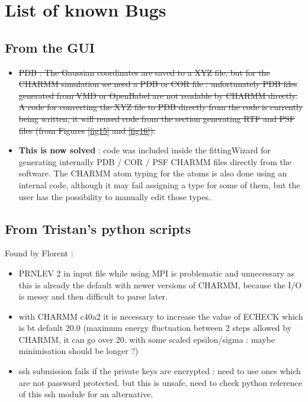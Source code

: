 \documentclass[12pt,a4paper]{article}
\begin{document}

\section{List of known Bugs}

\subsection{From the GUI}

\begin{itemize}
\item \sout{ 
PDB : The Gaussian coordinates are saved to a XYZ file, but for the CHARMM simulation 
we need 
a PDB or COR file : unfortunately PDB files generated from VMD or OpenBabel are not readable by 
CHARMM directly. A code for converting the XYZ file to PDB directly from the code is currently 
being written, it will reused code from the section generating RTF and PSF files (from Figures 
\ref{fig15} and \ref{fig16}). 
}

\item \textbf{This is now solved} : code was included inside the fittingWizard for generating 
internally PDB 
/ COR / PSF CHARMM files directly from the software. The CHARMM atom typing for the atoms is also 
done using an internal code, although it may fail assigning a type for some of them, but the user 
has the possibility to manually edit those types.


\end{itemize}

\subsection{From Tristan's python scripts}

Found by Florent :
\begin{itemize}
\item PRNLEV 2 in input file while using MPI is problematic and unnecessary as this is already the 
default with newer versions of CHARMM, because the I/O is messy and then difficult to parse later.
\item with CHARMM c40a2 it is necessary to increase the value of ECHECK which is bt default 20.0 
(maximum energy fluctuation between 2 steps allowed by CHARMM, it can go over 20. with some scaled 
epsilon/sigma : maybe minimisation should be longer ?)
\item ssh submission fails if the private keys are encrypted : need to use ones which are not 
password protected. but this is unsafe, need to check python reference of this ssh module for an 
alternative. 
\end{itemize}
\end{document}
